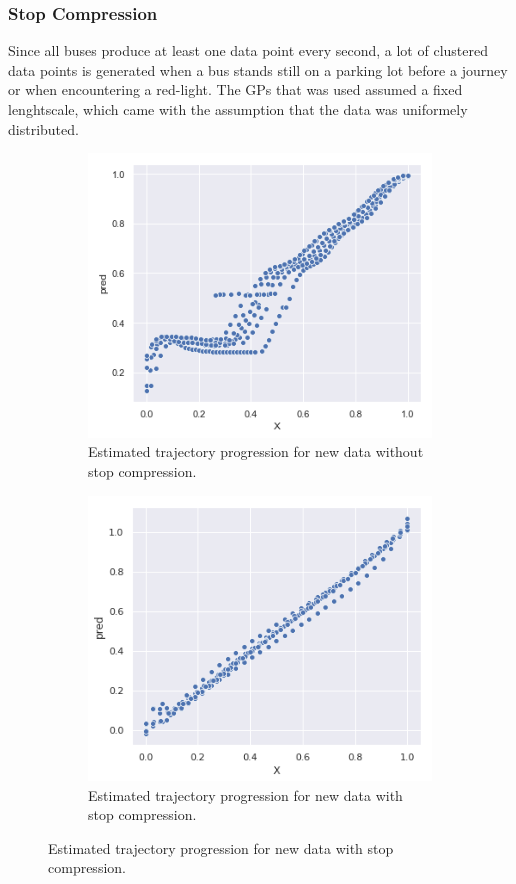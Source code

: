 \subsubsection{Stop Compression}
Since all buses produce at least one data point every second, a lot of clustered data points is generated when a bus stands still on a parking lot before a journey or when encountering a red-light. The GPs that was used assumed a fixed lenghtscale, which came with the assumption that the data was uniformely distributed.
\begin{figure}[H]
  \begin{subfigure}[b]{0.5\textwidth}
    \includegraphics[width=\textwidth]{figures/traj-without-stop-compression.png}
    \caption{Estimated trajectory progression for new data without stop compression.}
    \label{fig:progression-without-stop-compression}
  \end{subfigure}
  \begin{subfigure}[b]{0.5\textwidth}
    \includegraphics[width=\textwidth]{figures/traj-with-stop-compression.png}
    \caption{Estimated trajectory progression for new data with stop compression.}
    \label{fig:progression-with-stop-compression}
  \end{subfigure}
\end{figure}
